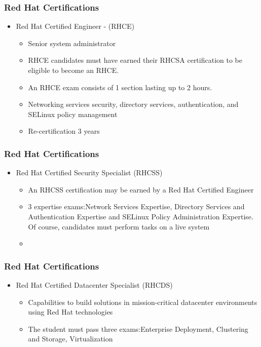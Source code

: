 \documentclass{beamer}
\begin{document}
\begin{frame}
\frametitle{Red Hat Certifications}
\begin{itemize}
\item Red Hat Certified Engineer - (RHCE)
\begin {itemize}
 \item Senior system administrator
 \item RHCE candidates must have earned their RHCSA certification to be eligible to become an RHCE.
 \item An RHCE exam consists of 1 section lasting up to 2 hours.
 \item Networking services security, directory services, authentication, and SELinux policy management
 \item Re-certification 3 years
\end {itemize}
\end{itemize}
\end{frame}

\begin{frame}
\frametitle{Red Hat Certifications}
\begin{itemize}
\item Red Hat Certified Security Specialist (RHCSS)
\begin {itemize}
 \item An RHCSS certification may be earned by a Red Hat Certified Engineer
 \item 3 expertise exams:Network Services Expertise, Directory Services and Authentication Expertise and SELinux Policy  Administration Expertise. Of course, candidates must perform tasks on a live system
 \item 
\end {itemize}
\end{itemize}
\end{frame}

\begin{frame}
\frametitle{Red Hat Certifications}
\begin{itemize}
\item Red Hat Certified Datacenter Specialist (RHCDS)
\begin {itemize}
\item Capabilities to build solutions in mission-critical datacenter environments using Red Hat technologies
\item The student must pass three exams:Enterprise Deployment, Clustering and Storage, Virtualization

\end {itemize}
\end{itemize}
\end{frame}
\end{document}
